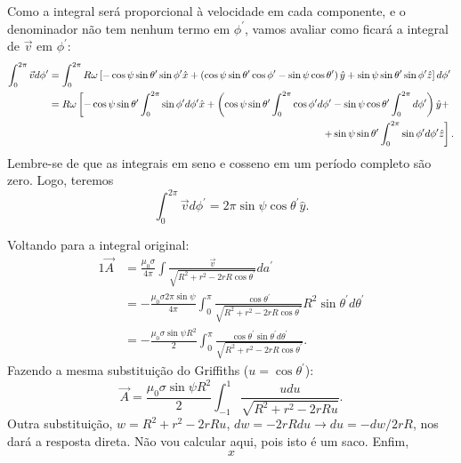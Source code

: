 \documentclass{article}
\begin{document}
Como a integral será proporcional à velocidade em cada componente, e o denominador não tem nenhum termo em $\phi^{\prime}$, vamos avaliar como ficará a integral de
$\vec{v}$ em $\phi^{\prime}$:
\begin{alignat}{2}
 \int_{0}^{2\pi} \vec{v} d\phi^{\prime} &=
 \int_{0}^{2\pi} R\omega \left[ -\cos{\psi}\sin{\theta^{\prime}}\sin{\phi^{\prime}} \hat{x} + \left( \cos{\psi}\sin{\theta^{\prime}}\cos{\phi^{\prime}} -
\sin{\psi}\cos{\theta^{\prime}}\right) \hat{y} + \sin{\psi}\sin{\theta^{\prime}\sin{\phi^{\prime}}} \hat{z}\right] d\phi^{\prime}\\ \nonumber
&= R\omega \left[ -\cos{\psi}\sin{\theta^{\prime}} \int_{0}^{2\pi} \sin{\phi^{\prime}} d\phi^{\prime} \hat{x} + \left( \cos{\psi}\sin{\theta^{\prime}}
\int_{0}^{2\pi} \cos{\phi^{\prime}} d\phi^{\prime}-
\sin{\psi}\cos{\theta^{\prime}}\int_{0}^{2\pi} d\phi^{\prime} \right) \hat{y} +\right.\\
&\hspace{9.5cm} \left. + \sin{\psi}\sin{\theta^{\prime}\int_{0}^{2\pi}\sin{\phi^{\prime}}}d\phi^{\prime} \hat{z} \right].
\end{alignat}
Lembre-se de que as integrais em seno e cosseno em um período completo são zero. Logo, teremos
\begin{equation}
 \int_{0}^{2\pi} \vec{v} d\phi^{\prime} = 2\pi \sin{\psi}\cos{\theta^{\prime}} \hat{y}.
\end{equation}

Voltando para a integral original:
\begin{alignat}{1}
 \vec{A} &= \frac{\mu_0 \sigma}{4 \pi} \int \frac{\vec{v}}{\sqrt{R^2 + r^{2} - 2rR\cos{\theta^{\prime}}}} da^{\prime}\\
 &= - \frac{\mu_0 \sigma 2\pi \sin{\psi}}{4 \pi} \int_{0}^{\pi} \frac{\cos{\theta^{\prime}}}{\sqrt{R^2 + r^{2} - 2rR\cos{\theta^{\prime}}}}
 R^2 \sin{\theta^{\prime}}d\theta^{\prime}\\
 &= - \frac{\mu_0 \sigma \sin{\psi} R^2}{2} \int_{0}^{\pi}
 \frac{\cos{\theta^{\prime}}\sin{\theta^{\prime}}d\theta^{\prime}}{\sqrt{R^2 + r^{2} - 2rR\cos{\theta^{\prime}}}}.
\end{alignat}
Fazendo a mesma substituição do Griffiths ($u = \cos{\theta^{\prime}}$):
\begin{equation}
 \vec{A} = \frac{\mu_0 \sigma \sin{\psi} R^2}{2} \int_{-1}^{1} \frac{udu}{\sqrt{R^2 + r^{2} - 2rRu}}.
\end{equation}
Outra substituição, $w = R^2 + r^{2} - 2rRu$, $dw = - 2rRdu \to du = -dw \slash 2rR$, nos dará a resposta direta. Não vou calcular aqui, pois isto é um saco. Enfim,
\begin{equation}
 x
\end{equation}
\end{document}
